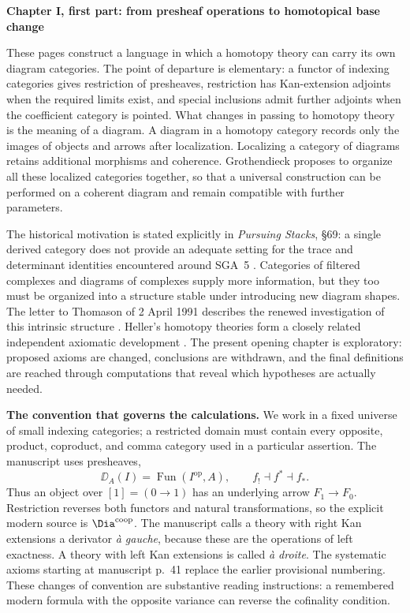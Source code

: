 \noindent\textbf{Chapter I, first part: from presheaf operations to homotopical base change}

These pages construct a language in which a homotopy theory can carry its own diagram categories. The point of departure is elementary: a functor of indexing categories gives restriction of presheaves, restriction has Kan-extension adjoints when the required limits exist, and special inclusions admit further adjoints when the coefficient category is pointed. What changes in passing to homotopy theory is the meaning of a diagram. A diagram in a homotopy category records only the images of objects and arrows after localization. Localizing a category of diagrams retains additional morphisms and coherence. Grothendieck proposes to organize all these localized categories together, so that a universal construction can be performed on a coherent diagram and remain compatible with further parameters.

The historical motivation is stated explicitly in \emph{Pursuing Stacks}, \S69: a single derived category does not provide an adequate setting for the trace and determinant identities encountered around SGA~5 \citep[\S69]{Grothendieck1983}. Categories of filtered complexes and diagrams of complexes supply more information, but they too must be organized into a structure stable under introducing new diagram shapes. The letter to Thomason of 2 April 1991 describes the renewed investigation of this intrinsic structure \citep[pp.~2--4]{Grothendieck1991Letter}. Heller's homotopy theories form a closely related independent axiomatic development \citep{Heller1988}. The present opening chapter is exploratory: proposed axioms are changed, conclusions are withdrawn, and the final definitions are reached through computations that reveal which hypotheses are actually needed.

\medskip\noindent\textbf{The convention that governs the calculations.}
We work in a fixed universe of small indexing categories; a restricted domain must contain every opposite, product, coproduct, and comma category used in a particular assertion. The manuscript uses presheaves,
\[
 \DD_A(I)=\operatorname{Fun}(I^{\mathrm{op}},A),
 \qquad f_!\dashv f^*\dashv f_*.
\]
Thus an object over $[1]=(0\to1)$ has an underlying arrow $F_1\to F_0$. Restriction reverses both functors and natural transformations, so the explicit modern source is $\Dia^{\mathrm{coop}}$. The manuscript calls a theory with right Kan extensions a derivator \emph{\`a gauche}, because these are the operations of left exactness. A theory with left Kan extensions is called \emph{\`a droite}. The systematic axioms starting at manuscript p.~41 replace the earlier provisional numbering. These changes of convention are substantive reading instructions: a remembered modern formula with the opposite variance can reverse the cofinality condition.

